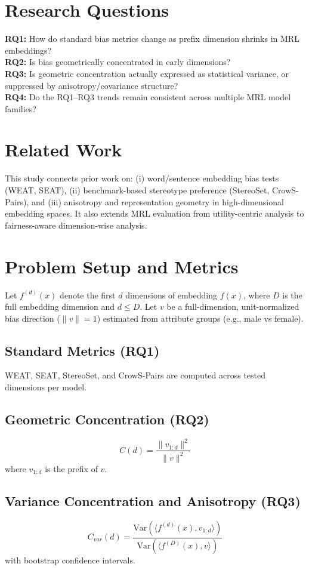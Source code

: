 \documentclass[conference]{IEEEtran}
\begin{document}
\section{Research Questions}
\textbf{RQ1:} How do standard bias metrics change as prefix dimension shrinks in MRL embeddings?\\
\textbf{RQ2:} Is bias geometrically concentrated in early dimensions?\\
\textbf{RQ3:} Is geometric concentration actually expressed as statistical variance, or suppressed by anisotropy/covariance structure?\\
\textbf{RQ4:} Do the RQ1--RQ3 trends remain consistent across multiple MRL model families?

\section{Related Work}
This study connects prior work on: (i) word/sentence embedding bias tests (WEAT, SEAT), (ii) benchmark-based stereotype preference (StereoSet, CrowS-Pairs), and (iii) anisotropy and representation geometry in high-dimensional embedding spaces. It also extends MRL evaluation from utility-centric analysis to fairness-aware dimension-wise analysis.

\section{Problem Setup and Metrics}
Let $f^{(d)}(x)$ denote the first $d$ dimensions of embedding $f(x)$, where $D$ is the full embedding dimension and $d\leq D$. Let $v$ be a full-dimension, unit-normalized bias direction ($\|v\|=1$) estimated from attribute groups (e.g., male vs female).

\subsection{Standard Metrics (RQ1)}
WEAT, SEAT, StereoSet, and CrowS-Pairs are computed across tested dimensions per model.

\subsection{Geometric Concentration (RQ2)}
\begin{equation}
C(d)=\frac{\|v_{1:d}\|^2}{\|v\|^2}
\end{equation}
where $v_{1:d}$ is the prefix of $v$.

\subsection{Variance Concentration and Anisotropy (RQ3)}
\begin{equation}
C_{var}(d)=\frac{\mathrm{Var}(\langle f^{(d)}(x),v_{1:d}\rangle)}{\mathrm{Var}(\langle f^{(D)}(x),v\rangle)}
\end{equation}
with bootstrap confidence intervals.
\end{document}
